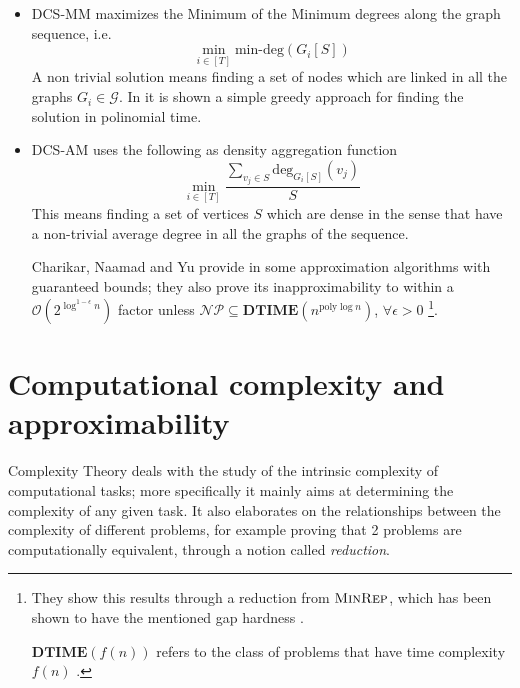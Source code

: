 \begin{itemize}
	\item \acrshort{DCS}-MM maximizes the Minimum of the Minimum degrees along
	      the graph sequence, i.e.
	      \begin{equation}
		      \min_{i \in [T]} \text{min-deg} (G_i[S])
	      \end{equation}
	      A non trivial solution means finding a set of nodes which are linked
	      in all the graphs $G_i \in \mathcal{G} $.
	      In \cite{semertzidis2019finding} it is shown a simple greedy approach
	      for finding the solution in polinomial time.
	\item \acrshort{DCS}-AM uses the following as density aggregation function
	      \begin{equation}
		      \min_{i \in [T]}
		      \frac{\sum^{}_{v_{j} \in S } \text{deg}_{G_i[S]} (v_{j} )}{S}
	      \end{equation}
	      This means finding a set of vertices $S$ which are dense in the sense
	      that have a non-trivial average degree in all the graphs of the
	      sequence.

	      Charikar, Naamad and Yu provide in \cite{charikar2018finding} some
	      approximation algorithms with guaranteed bounds; they also prove its
	      inapproximability to within a $\mathcal{O}(2 ^{\log^{1-\epsilon} n} )
	      $ factor unless $\mathcal{NP} \subseteq \mathbf{DTIME} (n
		      ^{\text{poly}\log n} ) $, $\forall \epsilon > 0$
	      \footnote{They show this results through a reduction from
	      $\textsc{MinRep}$, which has been shown to have the mentioned gap
	      hardness \cite{charikar2018finding}\cite{kortsarz2001hardness}.

	      $ \mathbf{DTIME}(f(n)) $ refers to the class of problems that
	      have time complexity $f(n)$ \cite{9780521884730}.
	      }.
\end{itemize}

\clearpage

\section{Computational complexity and \\approximability}%
\label{sec:computational_complexity_and_approximability}

Complexity Theory deals with the study of the intrinsic complexity of
computational tasks; more specifically it mainly aims at determining the
complexity of any given task. It also elaborates on the relationships between
the complexity of different problems, for example proving that 2 problems are
computationally equivalent\cite{9780521884730}, through a notion called
\emph{reduction}.

